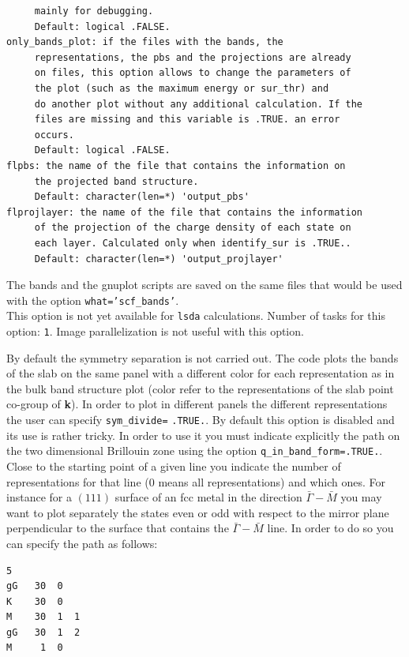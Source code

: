 \documentclass[12pt,a4paper,twoside]{report}
\begin{document}
\begin{verbatim}
     mainly for debugging.
     Default: logical .FALSE.
only_bands_plot: if the files with the bands, the 
     representations, the pbs and the projections are already 
     on files, this option allows to change the parameters of 
     the plot (such as the maximum energy or sur_thr) and
     do another plot without any additional calculation. If the 
     files are missing and this variable is .TRUE. an error 
     occurs.
     Default: logical .FALSE.
flpbs: the name of the file that contains the information on 
     the projected band structure.
     Default: character(len=*) 'output_pbs'
flprojlayer: the name of the file that contains the information 
     of the projection of the charge density of each state on 
     each layer. Calculated only when identify_sur is .TRUE..
     Default: character(len=*) 'output_projlayer'
\end{verbatim}


The bands and the gnuplot scripts are saved on the same files that would
be used with the option \texttt{what='scf\_bands'}. \\
This option is not yet available for \texttt{lsda} calculations.
Number of tasks for this option: \texttt{1}. Image parallelization is
not useful with this option. 

By default the symmetry separation is not carried out. The code plots the
bands of the slab on the same panel with a different color for each 
representation as in the bulk band structure plot (color refer to the 
representations of the slab point co-group of {\bf k}). 
In order to plot in different panels the different representations
the user can specify \texttt{sym\_divide=} \texttt{.TRUE.}.
By default this option is disabled and its use is rather tricky.
In order to use it you must indicate explicitly the
path on the two dimensional Brillouin zone using the option
\texttt{q\_in\_band\_form=.TRUE.}. Close to the
starting point of a given line you indicate the number of 
representations for that line ($0$ means all representations) and which ones.
For instance for a $(111)$ surface of an fcc metal in the direction 
$\bar \Gamma-\bar M$ you may
want to plot separately the states even or odd with respect to the mirror
plane perpendicular to the surface that contains the $\bar \Gamma-\bar M$
line.
In order to do so you can specify the path as follows:

\begin{verbatim}
5
gG   30  0
K    30  0
M    30  1  1
gG   30  1  2
M     1  0
\end{verbatim}
\end{document}
